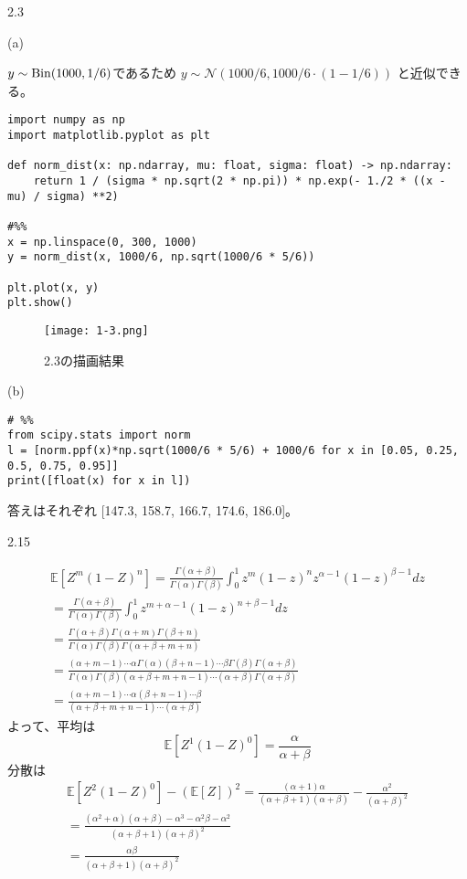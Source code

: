 \documentclass[pdflatex,ja=standard]{bxjsarticle}
\begin{document}
2.3

(a)

$y \sim \rm{Bin}(1000, 1/6) $であるため $y \sim \mathcal{N} (1000/6, 1000/6\cdot(1-1/6))$
と近似できる。

\begin{lstlisting}
import numpy as np
import matplotlib.pyplot as plt

def norm_dist(x: np.ndarray, mu: float, sigma: float) -> np.ndarray:
    return 1 / (sigma * np.sqrt(2 * np.pi)) * np.exp(- 1./2 * ((x - mu) / sigma) **2)

#%% 
x = np.linspace(0, 300, 1000)
y = norm_dist(x, 1000/6, np.sqrt(1000/6 * 5/6))

plt.plot(x, y)
plt.show()

\end{lstlisting}

\begin{figure}
    \centering
    \texttt{[image: 1-3.png]}
    \caption{2.3の描画結果}
    \label{fig:placeholder}
\end{figure}

(b)

\begin{lstlisting}
# %%
from scipy.stats import norm
l = [norm.ppf(x)*np.sqrt(1000/6 * 5/6) + 1000/6 for x in [0.05, 0.25, 0.5, 0.75, 0.95]]
print([float(x) for x in l])
\end{lstlisting}

答えはそれぞれ [147.3, 158.7, 166.7, 174.6, 186.0]。

2.15

\begin{gather}
\mathbb{E} [Z^m(1-Z)^n] = \frac{\Gamma(\alpha+\beta)}{\Gamma(\alpha)\Gamma(\beta)} \int_0^1 z^m (1-z)^n z^{\alpha-1}(1-z)^{\beta-1} dz \\
= \frac{\Gamma(\alpha+\beta)}{\Gamma(\alpha)\Gamma(\beta)} \int_0^1 z^{m+\alpha-1} (1-z)^{n+\beta-1} dz \\
= \frac{\Gamma(\alpha+\beta)\Gamma(\alpha+m)\Gamma(\beta+n)}{\Gamma(\alpha) \Gamma(\beta)\Gamma(\alpha+\beta+m+n)} \\
=\frac{(\alpha+m-1)\cdots \alpha \Gamma(\alpha) (\beta+n-1) \cdots \beta \Gamma(\beta) \Gamma(\alpha+\beta)}{\Gamma(\alpha)\Gamma(\beta)(\alpha+\beta+m+n-1) \cdots (\alpha+\beta) \Gamma(\alpha+\beta)} \\
=\frac{(\alpha+m-1) \cdots \alpha (\beta+n-1) \cdots\beta}{(\alpha+\beta+m+n-1) \cdots (\alpha+\beta)}
\end{gather}
よって、平均は
\begin{equation}
\mathbb{E}[Z^1(1-Z)^0]=\frac{\alpha}{\alpha+\beta}
\end{equation}
分散は
\begin{gather}
\mathbb{E}[Z^2(1-Z)^0] - (\mathbb{E}[Z])^2 = \frac{(\alpha+1)\alpha}{(\alpha+\beta+1)(\alpha+\beta)} - \frac{\alpha^2}{(\alpha+\beta)^2} \\
= \frac{(\alpha^2+\alpha)(\alpha+\beta) - \alpha^3 -\alpha^2\beta-\alpha^2}{(\alpha+\beta+1)(\alpha+\beta)^2} \\
= \frac{\alpha\beta}{(\alpha+\beta+1)(\alpha+\beta)^2}
\end{gather}
\end{document}
